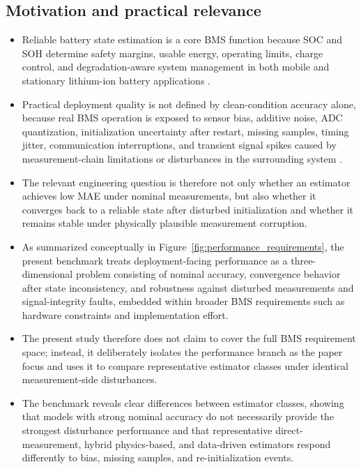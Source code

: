 \documentclass[review]{elsarticle}
\begin{document}
\subsection{Motivation and practical relevance}
\begin{itemize}[leftmargin=*]
    \item Reliable battery state estimation is a core BMS function because SOC and SOH determine safety margins, usable energy, operating limits, charge control, and degradation-aware system management in both mobile and stationary lithium-ion battery applications \cite{shrivastavaReviewTechnologicalAdvancement2023,guoSystematicReviewElectrochemical2024,yaoSmarterBatteryManagement2025b}.
    \item Practical deployment quality is not defined by clean-condition accuracy alone, because real BMS operation is exposed to sensor bias, additive noise, ADC quantization, initialization uncertainty after restart, missing samples, timing jitter, communication interruptions, and transient signal spikes caused by measurement-chain limitations or disturbances in the surrounding system \cite{liRobustnessSOCEstimation2015,naseriReliableWirelessBMS2025,bergerBenchmarkingBatteryManagement2024}.
    \item The relevant engineering question is therefore not only whether an estimator achieves low MAE under nominal measurements, but also whether it converges back to a reliable state after disturbed initialization and whether it remains stable under physically plausible measurement corruption.
    \item As summarized conceptually in Figure~\ref{fig:performance_requirements}, the present benchmark treats deployment-facing performance as a three-dimensional problem consisting of nominal accuracy, convergence behavior after state inconsistency, and robustness against disturbed measurements and signal-integrity faults, embedded within broader BMS requirements such as hardware constraints and implementation effort.
    \item The present study therefore does not claim to cover the full BMS requirement space; instead, it deliberately isolates the performance branch as the paper focus and uses it to compare representative estimator classes under identical measurement-side disturbances.
    \item The benchmark reveals clear differences between estimator classes, showing that models with strong nominal accuracy do not necessarily provide the strongest disturbance performance and that representative direct-measurement, hybrid physics-based, and data-driven estimators respond differently to bias, missing samples, and re-initialization events.
\end{itemize}
\end{document}

